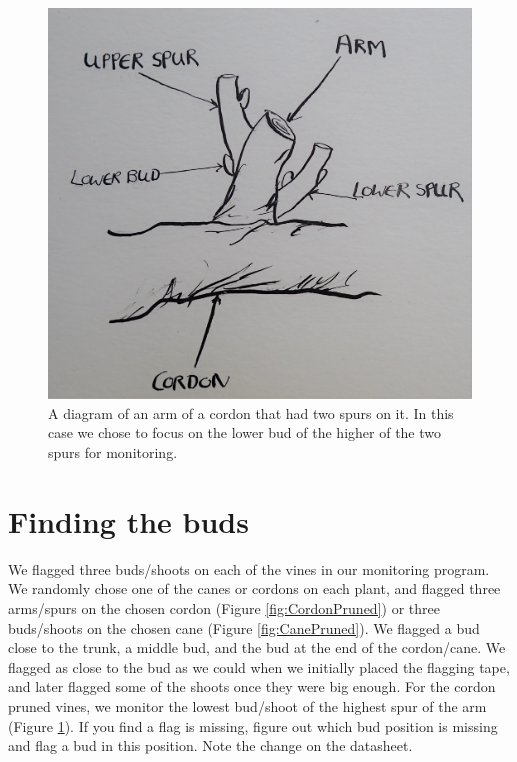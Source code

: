 \documentclass[11pt,letter]{article}
\begin{document}
\begin{figure}%
  \includegraphics[width=\linewidth]{TwoSpurs.jpg}
  \caption{A diagram of an arm of a cordon that had two spurs on it. In this case we chose to focus on the lower bud of the higher of the two spurs for monitoring. }
  \label{fig:TwoSpurs}
\end{figure}

\section{Finding the buds}
We flagged three buds/shoots on each of the vines in our monitoring program. We randomly chose one of the canes or cordons on each plant, and flagged three arms/spurs on the chosen cordon (Figure \ref{fig:CordonPruned}) or three buds/shoots on the chosen cane (Figure \ref{fig:CanePruned}). We flagged a bud close to the trunk, a middle bud, and the bud at the end of the cordon/cane. We flagged as close to the bud as we could when we initially placed the flagging tape, and later flagged some of the shoots once they were big enough. For the cordon pruned vines, we monitor the lowest bud/shoot of the highest spur of the arm (Figure \ref{fig:TwoSpurs}). If you find a flag is missing, figure out which bud position is missing and flag a bud in this position. Note the change on the datasheet.
\end{document}
